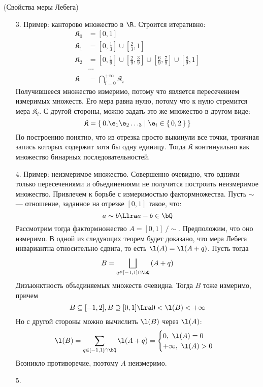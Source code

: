 \begin{theorem}(Свойства меры Лебега)
    \begin{itemize}
        \item[3.] Пример: канторово множество в $\R$. Строится итеративно:
\begin{align*}
	\mathfrak{K}_0 &= \left[0, 1\right] \\
	\mathfrak{K}_1 &= \left[0, \frac{1}{3}\right] \cup \left[\frac{2}{3}, 1\right]\\
	\mathfrak{K}_2 &= \left[0, \frac{1}{9}\right] \cup \left[\frac{2}{9}, \frac{3}{9}\right]
		\cup \left[\frac{6}{9}, \frac{7}{9}\right] \cup \left[\frac{8}{9}, 1\right]
			   \\	&\cdots \\
	\mathfrak{K} &= \bigcap_{i = 0}^{+\infty}{\mathfrak{K}_i}
\end{align*}
		Получившееся множество измеримо, потому что является пересечением измеримых
		множеств. Его мера равна нулю, потому что к нулю стремится мера
		$\mathfrak{K}_i$. С другой стороны, можно задать это же множество в другом виде:
\[
	\mathfrak{K} = \{\, 0.\e_1\e_2\ldots_3  \mid \e_i \in \{\,0,2\,\}  \,\}
\]
		По построению понятно, что из отрезка просто выкинули все точки, троичная запись
		которых содержит хотя бы одну единицу. Тогда $\mathfrak{K}$ континуально
		как множество бинарных последовательностей.
        \item[4.] Пример: неизмеримое множество. Совершенно очевидно, что одними
			только пересечениями и объединениями не получится построить неизмеримое множество.
			Привлечем к борьбе с измеримостью фактормножества. Пусть $\sim$ --- отношение,
			заданное на отрезке $[0, 1]$ такое, что:
\[
	a \sim b \Llra a - b \in \bQ
\]
		Рассмотрим тогда фактормножество $A = [0, 1] ~/ \sim$. Предположим, что оно
		измеримо. В одной из следующих теорем будет доказано, что мера Лебега инвариантна
		относительно сдвига, то есть $\l(A) = \l(A + q)$. Пусть тогда
\[
	B = \bigsqcup_{q \in [-1, 1] \cap \bQ}{\left(A + q\right)}
\]
		Дизъюнктность объединяемых множеств очевидна. Тогда $B$ тоже измеримо, причем
\[
	B \subseteq [-1, 2], B \supseteq [0, 1] \Lra 0 < \l(B) < +\infty
\]
		Но с другой стороны можно вычислить $\l(B)$ через $\l(A)$:
\[
	\l(B) = \sum_{q \in [-1, 1] \cap \bQ}{\l(A + q)} = \begin{cases}
		0,~ \l(A) = 0 \\
		+\infty,~ \l(A) > 0
	\end{cases}
\]
		Возникло противоречие, поэтому $A$ неизмеримо.
	    \item[5.] \begin{itemize}

\end{itemize}
\end{itemize}
\end{theorem}
